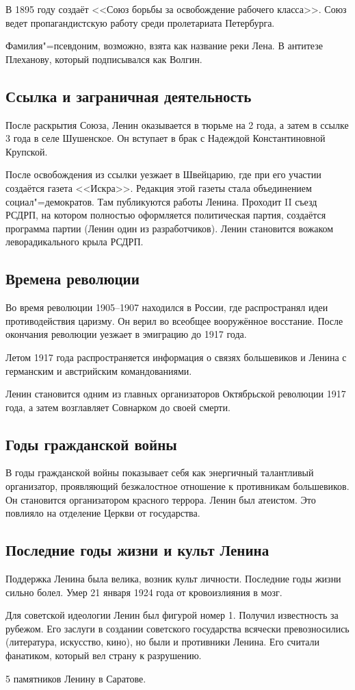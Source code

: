 В 1895 году создаёт <<Союз борьбы за освобождение рабочего класса>>. Союз ведет пропагандистскую работу среди пролетариата Петербурга. 

Фамилия"=псевдоним, возможно, взята как название реки Лена. В антитезе Плеханову, который подписывался как Волгин.

\subsection{Ссылка и заграничная деятельность}

После раскрытия Союза, Ленин оказывается в тюрьме на 2 года, а затем в ссылке 3 года в селе Шушенское. Он вступает в брак с Надеждой Константиновной Крупской.

После освобождения из ссылки уезжает в Швейцарию, где при его участии создаётся газета <<Искра>>. Редакция этой газеты стала объединением социал"=демократов. Там публикуются работы Ленина. Проходит II съезд РСДРП, на котором полностью оформляется политическая партия, создаётся программа партии (Ленин один из разработчиков). Ленин становится вожаком леворадикального крыла РСДРП.

\subsection{Времена революции}

Во время революции 1905--1907 находился в России, где распространял идеи противодействия царизму. Он верил во всеобщее вооружённое восстание. После окончания революции уезжает в эмиграцию до 1917 года.

Летом 1917 года распространяется информация о связях большевиков и Ленина с германским и австрийским командованиями.

Ленин становится одним из главных организаторов Октябрьской революции 1917 года, а затем возглавляет Совнарком до своей смерти.

\subsection{Годы гражданской войны}

В годы гражданской войны показывает себя как энергичный талантливый организатор, проявляющий безжалостное отношение к противникам большевиков. Он становится организатором красного террора. Ленин был атеистом. Это повлияло на отделение Церкви от государства.

\subsection{Последние годы жизни и культ Ленина}

Поддержка Ленина была велика, возник культ личности.
Последние годы жизни сильно болел. Умер 21 января 1924 года от кровоизлияния в мозг.

Для советской идеологии Ленин был фигурой номер 1. Получил известность за рубежом. Его заслуги в создании советского государства всячески превозносились (литература, искусство, кино), но были и противники Ленина. Его считали фанатиком, который вел страну к разрушению.

5 памятников Ленину в Саратове.
